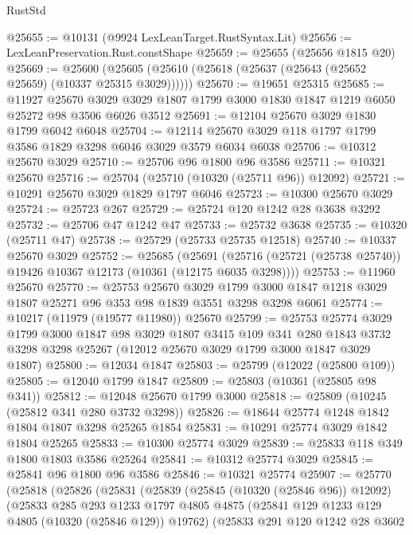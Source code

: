 \begin{lexlean}{RustStd}
\begin{coremodule}
@25655 := @10131 (@9924 LexLeanTarget.RustSyntax.Lit)
@25656 := LexLeanPreservation.Rust.constShape
@25659 := @25655 (@25656 @1815 @20)
@25669 := @25600 (@25605 (@25610 (@25618 (@25637 (@25643 (@25652 @25659) (@10337 @25315 @3029))))))
@25670 := @19651 @25315
@25685 := @11927
    @25670
    @3029
    @3029
    @1807
    @1799
    @3000
    @1830
    @1847
    @1219
    @6050
    @25272
    @98
    @3506
    @6026
    @3512
@25691 := @12104 @25670 @3029 @1830 @1799 @6042 @6048
@25704 := @12114 @25670 @3029 @118 @1797 @1799 @3586 @1829 @3298 @6046 @3029 @3579 @6034 @6038
@25706 := @10312 @25670 @3029
@25710 := @25706 @96 @1800 @96 @3586
@25711 := @10321 @25670
@25716 := @25704 (@25710 (@10320 (@25711 @96)) @12092)
@25721 := @10291 @25670 @3029 @1829 @1797 @6046
@25723 := @10300 @25670 @3029
@25724 := @25723 @267
@25729 := @25724 @120 @1242 @28 @3638 @3292
@25732 := @25706 @47 @1242 @47
@25733 := @25732 @3638
@25735 := @10320 (@25711 @47)
@25738 := @25729 (@25733 @25735 @12518)
@25740 := @10337 @25670 @3029
@25752 := @25685
    (@25691 (@25716 (@25721 (@25738 @25740)) @19426 @10367 @12173 (@10361 (@12175 @6035 @3298))))
@25753 := @11960 @25670
@25770 := @25753
    @25670
    @3029
    @1799
    @3000
    @1847
    @1218
    @3029
    @1807
    @25271
    @96
    @353
    @98
    @1839
    @3551
    @3298
    @3298
    @6061
@25774 := @10217 (@11979 (@19577 @11980)) @25670
@25799 := @25753
    @25774
    @3029
    @1799
    @3000
    @1847
    @98
    @3029
    @1807
    @3415
    @109
    @341
    @280
    @1843
    @3732
    @3298
    @3298
    @25267
    (@12012 @25670 @3029 @1799 @3000 @1847 @3029 @1807)
@25800 := @12034 @1847
@25803 := @25799 (@12022 (@25800 @109))
@25805 := @12040 @1799 @1847
@25809 := @25803 (@10361 (@25805 @98 @341))
@25812 := @12048 @25670 @1799 @3000
@25818 := @25809 (@10245 (@25812 @341 @280 @3732 @3298))
@25826 := @18644 @25774 @1248 @1842 @1804 @1807 @3298 @25265 @1854
@25831 := @10291 @25774 @3029 @1842 @1804 @25265
@25833 := @10300 @25774 @3029
@25839 := @25833 @118 @349 @1800 @1803 @3586 @25264
@25841 := @10312 @25774 @3029
@25845 := @25841 @96 @1800 @96 @3586
@25846 := @10321 @25774
@25907 := @25770
    (@25818
      (@25826
        (@25831
          (@25839
            (@25845 (@10320 (@25846 @96)) @12092)
            (@25833
              @285
              @293
              @1233
              @1797
              @4805
              @4875
              (@25841 @129 @1233 @129 @4805 (@10320 (@25846 @129)) @19762)
              (@25833
                @291
                @120
                @1242
                @28
                @3602

\end{coremodule}
\end{lexlean}
